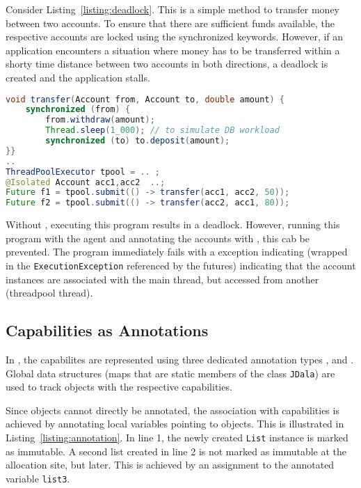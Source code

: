\documentclass[JDala.tex]{subfiles}
\begin{document}
Consider Listing~\ref{listing:deadlock}.  This is a simple method to transfer money between two accounts. To ensure that there are sufficient funds available, the respective accounts are locked using the  synchronized keywords.  However, if an application encounters a situation where money has to be transferred within a shorty time distance between two accounts in both directions, a deadlock is created and the application stalls.

\begin{lstlisting}[language=Java, caption=Money transfer implementation prone to deadlock, label=listing:deadlock]
void transfer(Account from, Account to, double amount) {
	synchronized (from) {
		from.withdraw(amount);
		Thread.sleep(1_000); // to simulate DB workload
		synchronized (to) to.deposit(amount);
}}
.. 
ThreadPoolExecutor tpool = .. ;
@Isolated Account acc1,acc2  ..;
Future f1 = tpool.submit(() -> transfer(acc1, acc2, 50)); 
Future f2 = tpool.submit(() -> transfer(acc2, acc1, 80));
\end{lstlisting}

Without \jdala, executing this program results in a deadlock.  However, running this program with the \jdala agent and annotating the accounts with \Isolated , this cab be prevented. The program immediately fails with a \jdala exception indicating (wrapped in the \texttt{ExecutionException} referenced by the futures) indicating that the account instances are associated with the main thread, but accessed from another (threadpool thread). 

\subsection{Capabilities as Annotations}
\label{subsection:capabilitesAsAnnotaions}

In \jdala, the \dala capabilites are represented using three dedicated annotation types \Immutable, \Isolated and \Local.  Global data structures (maps that are static members of the class \texttt{JDala}) are used to track objects with the respective capabilities.   

Since objects cannot directly be annotated, the association with capabilities is achieved by annotating local variables pointing to objects.  This is illustrated in Listing~\ref{listing:annotation}.  In line 1, the newly created \texttt{List} instance is marked as immutable.  A second list created in line 2 is not marked as immutable at the allocation site, but later. This is achieved by an assignment to the annotated variable \texttt{list3}. 
\end{document}
